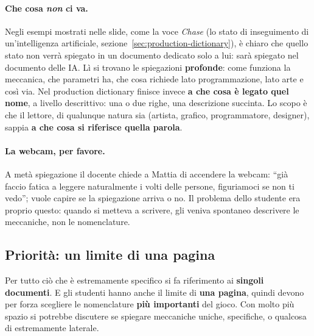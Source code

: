 \paragraph{Che cosa \emph{non} ci va.} Negli esempi mostrati nelle slide,
come la voce \emph{Chase} (lo stato di inseguimento di un'intelligenza
artificiale, sezione~\ref{sec:production-dictionary}), è chiaro che quello
stato non verrà spiegato in un documento dedicato solo a lui: sarà spiegato
nel documento delle IA. Lì si trovano le spiegazioni \textbf{profonde}: come
funziona la meccanica, che parametri ha, che cosa richiede lato
programmazione, lato arte e così via. Nel production dictionary finisce
invece \textbf{a che cosa è legato quel nome}, a livello descrittivo: una o
due righe, una descrizione succinta. Lo scopo è che il lettore, di qualunque
natura sia (artista, grafico, programmatore, designer), sappia \textbf{a che
cosa si riferisce quella parola}.

\paragraph{La webcam, per favore.} A metà spiegazione il docente chiede a
Mattia di accendere la webcam: ``già faccio fatica a leggere naturalmente i
volti delle persone, figuriamoci se non ti vedo''; vuole capire se la
spiegazione arriva o no. Il problema dello studente era proprio questo:
quando si metteva a scrivere, gli veniva spontaneo descrivere le meccaniche,
non le nomenclature.

\subsection{Priorità: un limite di una pagina}

Per tutto ciò che è estremamente specifico si fa riferimento ai
\textbf{singoli documenti}. E gli studenti hanno anche il limite di
\textbf{una pagina}, quindi devono per forza scegliere le nomenclature
\textbf{più importanti} del gioco. Con molto più spazio si potrebbe discutere
se spiegare meccaniche uniche, specifiche, o qualcosa di estremamente
laterale.

